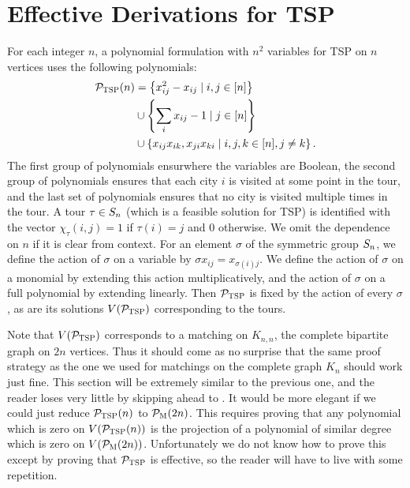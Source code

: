 \section{Effective Derivations for \textsc{TSP}}

For each integer $n$, a polynomial formulation with $n^2$ variables for \textsc{TSP} on $n$ vertices uses the following polynomials:
\begin{align}
\label{eq:tsp-formulation}\mathcal P_{\textsc{TSP}}(n) &= \left\{x_{ij}^2 - x_{ij} \mid i,j \in [n]\right\} \\ &\cup \left\{\sum_i x_{ij} - 1 \mid j \in [n]\right\} \nonumber \\ &\cup \left\{x_{ij}x_{ik}, x_{ji}x_{ki} \mid i,j,k \in [n], j \neq k\right\} \nonumber.
\end{align}
The first group of polynomials ensurwhere the variables are Boolean, the second group of polynomials ensures that each city $i$ is visited at some point in the tour, and the last set of polynomials ensures that no city is visited multiple times in the tour. A tour $\tau \in S_{n}$ (which is a feasible solution for \textsc{TSP}) is identified with the vector $\chi_\tau(i,j) = 1$ if $\tau(i) = j$ and $0$ otherwise. We omit the dependence on $n$ if it is clear from context. For an element $\sigma$ of the symmetric group $S_{n}$, we define the action of $\sigma$ on a variable by $\sigma x_{ij} = x_{\sigma(i)j}$.
We define the action of $\sigma$ on a monomial by extending this action multiplicatively, and the action of $\sigma$ on a full polynomial by extending linearly.
Then $\mathcal P_{\textsc{TSP}}$ is fixed by the action of every $\sigma$, as are its solutions $V(\mathcal P_{\textsc{TSP}})$ corresponding to the tours. 

Note that $V(\mathcal P_{\textsc{TSP}})$ corresponds to a matching on $K_{n,n}$, the complete bipartite graph on $2n$ vertices. Thus it should come as no surprise that the same proof strategy as the one we used for matchings on the complete graph $K_n$ should work just fine. This section will be extremely similar to the previous one, and the reader loses very little by skipping ahead to . It would be more elegant if we could just reduce $\mathcal P_{\textsc{TSP}}(n)$ to $\mathcal P_{\textsc{M}}(2n)$. This requires proving that any polynomial which is zero on $V(\mathcal P_{\textsc{TSP}}(n))$ is the projection of a polynomial of similar degree which is zero on $V(\mathcal P_{\textsc{M}}(2n))$. Unfortunately we do not know how to prove this except by proving that $\mathcal P_{\textsc{TSP}}$ is effective, so the reader will have to live with some repetition. 

